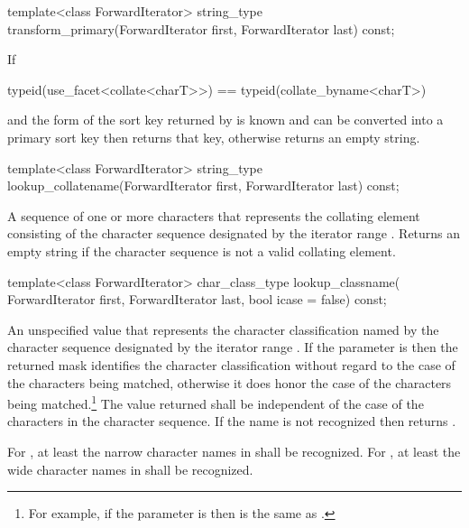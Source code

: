 %
\begin{itemdecl}
template<class ForwardIterator>
  string_type transform_primary(ForwardIterator first, ForwardIterator last) const;
\end{itemdecl}

\begin{itemdescr}
\pnum
\effects
If
\begin{codeblock}
typeid(use_facet<collate<charT>>) == typeid(collate_byname<charT>)
\end{codeblock}
and the form of the sort key returned
by  is known and
can be converted into a primary sort key then returns that key,
otherwise returns an empty string.
\end{itemdescr}

%
\begin{itemdecl}
template<class ForwardIterator>
  string_type lookup_collatename(ForwardIterator first, ForwardIterator last) const;
\end{itemdecl}

\begin{itemdescr}
\pnum
\returns
A sequence of one or more characters that
represents the collating element consisting of the character
sequence designated by the iterator range .
Returns an empty string if the character sequence is not a
valid collating element.
\end{itemdescr}

%
\begin{itemdecl}
template<class ForwardIterator>
  char_class_type lookup_classname(
    ForwardIterator first, ForwardIterator last, bool icase = false) const;
\end{itemdecl}

\begin{itemdescr}
\pnum
\returns
An unspecified value that represents
the character classification named by the character sequence
designated by the iterator range .
If the parameter  is  then the returned mask identifies the
character classification without regard to the case of the characters being
matched, otherwise it does honor the case of the characters being
matched.\footnote{For example, if the parameter  is  then
\tcode{[[:lower:]]} is the same as \tcode{[[:alpha:]]}.}
The value
returned shall be independent of the case of the characters in
the character sequence. If the name
is not recognized then returns .

\pnum
\remarks
For , at least the narrow character names
in  shall be recognized.
For , at least the wide character names
in  shall be recognized.
\end{itemdescr}

